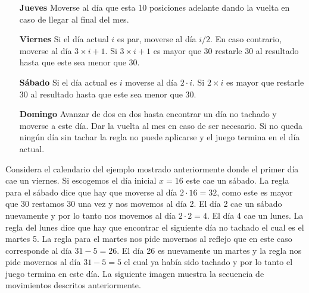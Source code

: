 \documentclass{oci}
\begin{document}
\begin{problemDescription}
\begin{itemize}
    \item[\bf Jueves] Moverse al día que esta 10 posiciones adelante dando la vuelta en caso de
    llegar al final del mes.

    \item[\bf Viernes] Si el día actual $i$ es par, moverse al día $i/2$.
    En caso contrario, moverse al día $3\times i + 1$.
    Si $3\times i + 1$ es mayor que 30 restarle 30 al resultado hasta que este sea menor que 30.

    \item[\bf Sábado] Si el día actual es $i$ moverse al día $2\cdot i$.
    Si $2\times i$ es mayor que restarle 30 al resultado hasta que este sea menor que 30.

    \item[\bf Domingo] Avanzar de dos en dos hasta encontrar un día no tachado y moverse a este día.
    Dar la vuelta al mes en caso de ser necesario.
    Si no queda ningún día sin tachar la regla no puede aplicarse y el juego termina en el día actual.
  \end{itemize}

  Considera el calendario del ejemplo mostrado anteriormente donde el primer día cae un viernes.
  Si escogemos el día inicial $x=16$ este cae un sábado.
  La regla para el sábado dice que hay que moverse al día $2\cdot 16 = 32$, como este es mayor que 30
  restamos 30 una vez y nos movemos al día 2.
  El día 2 cae un sábado nuevamente y por lo tanto nos movemos al día $2\cdot 2=4$.
  El día 4 cae un lunes.
  La regla del lunes dice que hay que encontrar el siguiente día no tachado el cual es el martes 5.
  La regla para el martes nos pide movernos al reflejo que en este caso corresponde al día $31 - 5 = 26$.
  El día 26 es nuevamente un martes y la regla nos pide movernos al día $31 - 5 = 5$ el cual ya había
  sido tachado y por lo tanto el juego termina en este día.
  La siguiente imagen muestra la secuencia de movimientos descritos anteriormente.


\end{problemDescription}
\end{document}
